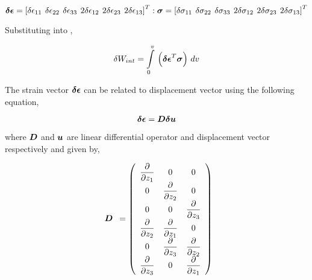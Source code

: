 \begin{equation}
  \vect{\delta \epsilon}=\transpose{\sqbrac{\delta \epsilon_{11} \hspace{4 pt} \delta \epsilon_{22} \hspace{4 pt} \delta \epsilon_{33} 
                         \hspace{4 pt} 2\delta \epsilon_{12} \hspace{4 pt} 2\delta \epsilon_{23} \hspace{4 pt} 2\delta \epsilon_{13}}} :
	       	         \vect{\sigma}=\transpose{\sqbrac{\delta \sigma_{11} \hspace{4 pt} \delta \sigma_{22} \hspace{4 pt} \delta \sigma_{33} 
		         \hspace{4 pt} 2\delta \sigma_{12} \hspace{4 pt} 2\delta \sigma_{23} \hspace{4 pt} 2\delta \sigma_{13} }}	  		  
  \label{eqn:newvectors}
\end{equation} 

Substituting  into ,

\begin{equation}
  \delta W_{int}=\gint{0}{v}{\pbrac{\transpose{\vect{\delta \epsilon}} \vect{\sigma}}}v
  \label{eqn:virtualenergy1}
\end{equation}

The strain vector $\vect{\delta \epsilon}$ can be related to displacement vector using the following equation,

\begin{equation}
  \vect{\delta \epsilon}=\matr{D} \vect{\delta u} 
  \label{eqn:virtualsmalldisplacement1}
\end{equation}

\noindent where $\matr{D}$ and $\vect{u}$ are linear differential operator and displacement vector respectively and given by,

\begin{equation}
  \begin{array}{c} \matr{D} \end{array} =
  \pbrac{ \begin{array}{ccc} \delby{}{z_{1}} & 0 & 0 \\ 
                             0 & \delby{}{z_{2}} & 0 \\
			     0 & 0 & \delby{}{z_{3}} \\
			     \delby{}{z_{2}} & \delby{}{z_{1}} & 0 \\ 
			     0 & \delby{}{z_{3}} & \delby{}{z_{2}} \\ 
			     \delby{}{z_{3}} & 0 & \delby{}{z_{1}} \\ \end{array} }
  \label{eqn:differentialoperator}
\end{equation}

